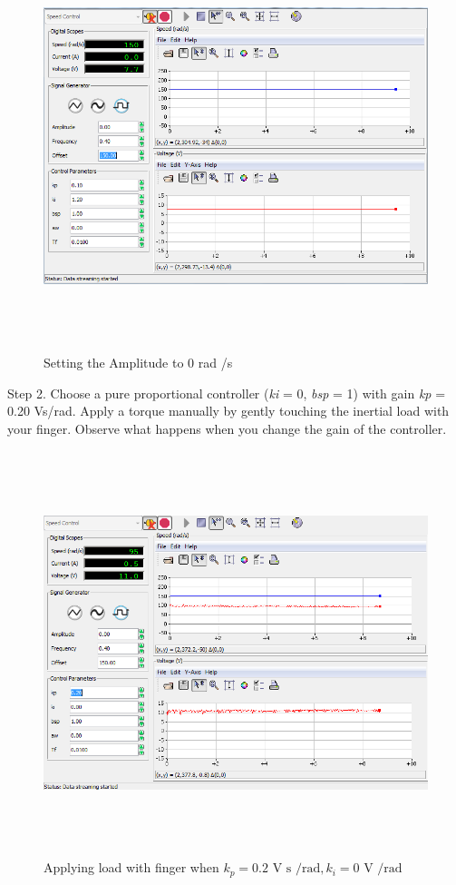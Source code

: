 \documentclass[]{article}
\begin{document}
\begin{figure}\includegraphics[width=6.50000in,height=4.68056in]{media/image48.png} \caption{Setting the Amplitude to 0 rad /s} \end{figure}

Step 2. Choose a pure proportional controller (\emph{ki} = 0, \emph{bsp}
= 1) with gain \emph{kp} = 0.20 Vs/rad. Apply a torque manually by
gently touching the inertial load with your finger. Observe what happens
when you change the gain of the controller.

\begin{figure}\includegraphics[width=6.50000in,height=4.63889in]{media/image22.png} \caption{Applying load with finger when $k_p = \text{0.2 V s /rad}, k_i = \text{0 V /rad}$} \end{figure}
\end{document}
